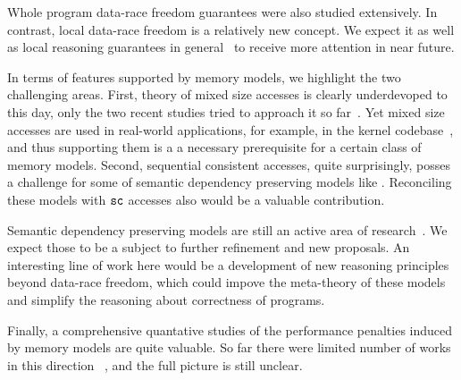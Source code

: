 Whole program data-race freedom guarantees were also studied extensively.
In contrast, local data-race freedom is a relatively new concept. 
We expect it as well as local reasoning guarantees 
in general~\cite{Dodds-al:ESOP18, Jagadeesan-al:OOPSLA2020, Cho-al:PLDI21} 
to receive more attention in near future.  

In terms of features supported by memory models, 
we highlight the two challenging areas.
First, theory of mixed size accesses is clearly 
underdevoped to this day, only the two recent studies 
tried to approach it so far~\cite{Flur-al:POPL17, Watt-al:PLDI2020}.
Yet mixed size accesses are used in real-world applications,
for example, in the \Linux kernel codebase~\cite{Flur-al:POPL17},
and thus supporting them is a a necessary prerequisite 
for a certain class of memory models. 
Second, sequential consistent accesses, quite surprisingly,
posses a challenge for some of semantic dependency preserving
models like \Promising. Reconciling these models with ${\mathtt{sc}}$ 
accesses also would be a valuable contribution.

Semantic dependency preserving models are still an active 
area of research~\cite{Kang-al:POPL17, Lee-al:PLDI20, Cho-al:PLDI21,
Chakraborty-Vafeiadis:POPL19, Paviotti-al:ESOP20, 
Jagadeesan-al:OOPSLA2020}. 
We expect those to be a subject to 
further refinement and new proposals. 
An interesting line of work here would be 
a development of new reasoning principles
beyond data-race freedom, which could 
impove the meta-theory of these models and 
simplify the reasoning about correctness of programs.   

Finally, a comprehensive quantative studies 
of the performance penalties induced by memory models are quite valuable.
So far there were limited number of works in this direction~%
\cite{Singh-al:ISCA12, Liu-al:OOPSLA17, Liu-al:PLDI19, 
Vollmer-al:PPoPP17, Dolan-al:PLDI18, Ou-Demsky:OOPSLA18}, 
and the full picture is still unclear. 


